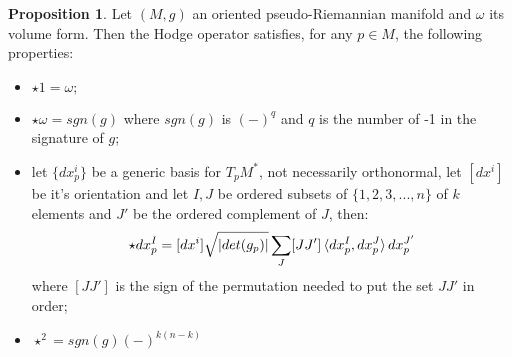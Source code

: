 \documentclass[12pt,a4paper]{report}
\theoremstyle{definition}
\theoremstyle{Theorem}
\newtheorem{Prop}[Def]{Proposition}
\theoremstyle{definition}
\theoremstyle{definition}
\begin{document}
	\begin{Prop}\label{Prop_1.7.2}
		Let $(M,g)$ an oriented pseudo-Riemannian manifold and $\omega$ its volume form. Then the Hodge operator satisfies, for any $p\in M$, the following properties:
		\begin{itemize}
			\item $\star 1=\omega;$
			\item $\star\omega=sgn(g)$ where $sgn(g)$ is $(-)^q$ and $q$ is the number of -1 in the signature of $g$;
			\item let $\{dx^i_p\}$ be a generic basis for $T_pM^*$, not necessarily orthonormal, let $[dx^i]$ be it's orientation and let $I,J$ be ordered subsets of $\{1,2,3,...,n\}$ of $k$ elements and $J'$ be the ordered complement of $J$, then:
			$$\star dx_p^I=[dx^i]\sqrt{|det(g_p)|}\sum_J[JJ']\braket{dx_p^I,dx_p^J}dx_p^{J'}$$
			where $[JJ']$ is the sign of the permutation needed to put the set $JJ'$ in order;
			\item $\star^2=sgn(g)(-)^{k(n-k)}$
		\end{itemize}
	\end{Prop}
\end{document}
